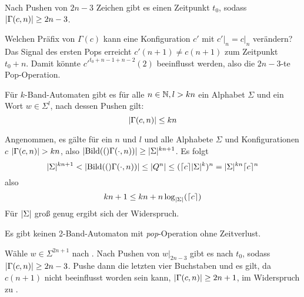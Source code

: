 \documentclass{article}
\begin{document}
\begin{satz}
    \label{thm:locontent}
    Nach Pushen von $2n-3$ Zeichen gibt es einen Zeitpunkt $t_0$, sodass $\lvert\Gamma(c,n)\rvert \geq 2n-3$.
    \begin{beweis}
        Welchen Präfix von $\Gamma(c)$ kann eine Konfiguration $c'$ mit $c' \big|_n = c \big|_n$ verändern? Das Signal des ersten Pops erreicht $c'(n+1) \neq c(n+1)$ zum Zeitpunkt $t_0+n$. Damit könnte $c'^{t_0+n-1+n-2}(2)$ beeinflusst werden, also die $2n-3$-te Pop-Operation.
    \end{beweis}
\end{satz}

\begin{satz}
    \label{cor:spacesize}
    Für $k$-Band-Automaten gibt es für alle $n \in \mathbb{N}, l > kn$ ein Alphabet $\Sigma$ und ein Wort $w \in \Sigma^l$, nach dessen Pushen gilt:
    \[ \lvert\Gamma(c,n)\rvert \leq kn \]
    \begin{beweis}
        Angenommen, es gälte für ein $n$ und $l$ und alle Alphabete $\Sigma$ und Konfigurationen $c$ $\lvert\Gamma(c,n)\rvert > kn$, also $\lvert\text{Bild}(()\Gamma(\cdot,n))\rvert \geq \lvert\Sigma\rvert^{kn+1}$.
        Es folgt
        \[ \lvert\Sigma\rvert^{kn+1} < \lvert\text{Bild}(()\Gamma(\cdot,n))\rvert \leq \lvert Q^n\rvert \leq (\lceil c\rceil\lvert\Sigma\rvert^k)^n = \lvert\Sigma\rvert^{kn} \lceil c\rceil^n \]
        also
        \[ kn + 1 \leq kn + n \log_{\lvert\Sigma\rvert}(\lceil c\rceil) \]
        Für $\lvert\Sigma\rvert$ groß genug ergibt sich der Widerspruch.
    \end{beweis}
\end{satz}

\begin{satz}
    Es gibt keinen 2-Band-Automaton mit \emph{pop}-Operation ohne Zeitverlust.
    \begin{beweis}
        Wähle $w \in \Sigma^{2n+1}$ nach . Nach Pushen von $w \big|_{2n-3}$ gibt es nach  $t_0$, sodass $\lvert\Gamma(c,n)\rvert \geq 2n-3$. Pushe dann die letzten vier Buchstaben und es gilt, da $c(n+1)$ nicht beeinflusst worden sein kann, $\lvert\Gamma(c,n)\rvert \geq 2n+1$, im Widerspruch zu .
    \end{beweis}
\end{satz}
\end{document}

